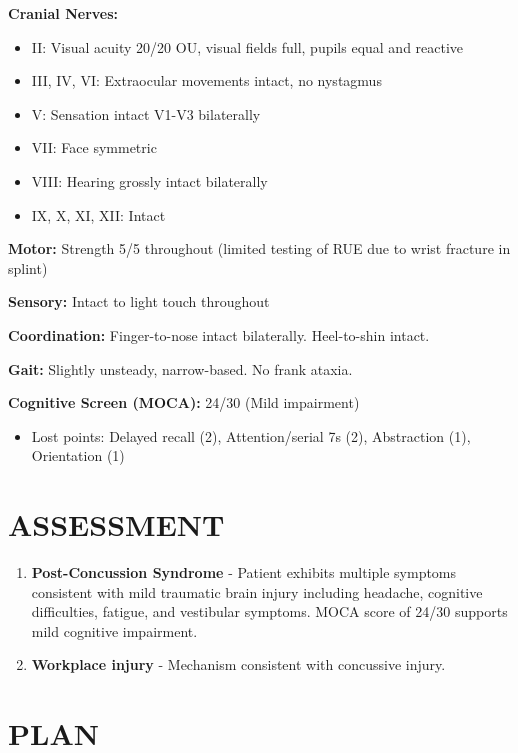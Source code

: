 \documentclass[11pt]{article}
\begin{document}
\textbf{Cranial Nerves:}
\begin{itemize}[nosep]
\item II: Visual acuity 20/20 OU, visual fields full, pupils equal and reactive
\item III, IV, VI: Extraocular movements intact, no nystagmus
\item V: Sensation intact V1-V3 bilaterally
\item VII: Face symmetric
\item VIII: Hearing grossly intact bilaterally
\item IX, X, XI, XII: Intact
\end{itemize}

\textbf{Motor:} Strength 5/5 throughout (limited testing of RUE due to wrist fracture in splint)

\textbf{Sensory:} Intact to light touch throughout

\textbf{Coordination:} Finger-to-nose intact bilaterally. Heel-to-shin intact.

\textbf{Gait:} Slightly unsteady, narrow-based. No frank ataxia.

\textbf{Cognitive Screen (MOCA):} 24/30 (Mild impairment)
\begin{itemize}[nosep]
\item Lost points: Delayed recall (2), Attention/serial 7s (2), Abstraction (1), Orientation (1)
\end{itemize}

\section*{ASSESSMENT}

\begin{enumerate}
\item \textbf{Post-Concussion Syndrome} - Patient exhibits multiple symptoms consistent with mild traumatic brain injury including headache, cognitive difficulties, fatigue, and vestibular symptoms. MOCA score of 24/30 supports mild cognitive impairment.

\item \textbf{Workplace injury} - Mechanism consistent with concussive injury.
\end{enumerate}

\section*{PLAN}
\end{document}
